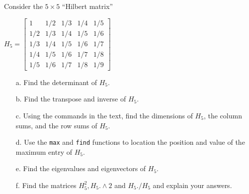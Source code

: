{Consider the $5 \times 5$ ``Hilbert matrix''

$
H_5
=
\left[
\begin{array}{ccccc}
1 & 1/2 & 1/3 & 1/4 & 1/5\\
1/2 & 1/3 & 1/4 & 1/5 & 1/6\\
1/3 & 1/4 & 1/5 & 1/6 &  1/7\\
1/4 & 1/5 & 1/6 & 1/7 & 1/8\\
1/5 & 1/6 & 1/7 & 1/8 & 1/9
\end{array}
\right]
$

\begin{enumerate}
	\item[a.] Find the determinant of $H_5$. 
	\item[b.] Find the transpose and inverse of $H_5$.
	\item[c.] Using the commands in the text, find the dimensions of $H_5$, the column sums, and the row sums of $H_5$.
	\item[d.] Use the \texttt{max} and \texttt{find} functions to location the position and value of the maximum entry of $H_5$.
	\item[e.] Find the eigenvalues and eigenvectors of $H_5$.
	\item[f.] Find the matrices $H_5^2, H_5.\land 2$ and $H_5./H_5$ and explain your answers.
\end{enumerate}
}
{}